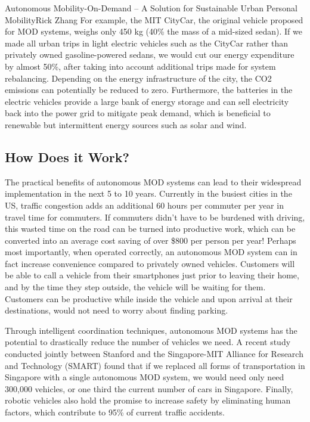 \documentclass{papertex}
\begin{document}
\begin{news}{2}{Autonomous Mobility-On-Demand – A Solution for Sustainable Urban Personal Mobility}{Rick Zhang}{}{}
For example, the MIT CityCar, the original vehicle proposed for MOD systems, 
weighs only 450 kg (40\% the mass of a mid-sized sedan). If we made all urban 
trips in light electric vehicles such as the CityCar rather than privately 
owned gasoline-powered sedans, we would cut our energy expenditure by almost 
50\%, after taking into account additional trips made for system rebalancing. 
Depending on the energy infrastructure of the city, the CO2 emissions can 
potentially be reduced to zero. Furthermore, the batteries in the electric 
vehicles provide a large bank of energy storage and can sell electricity back 
into the power grid to mitigate peak demand, which is beneficial to renewable 
but intermittent energy sources such as solar and wind.

\subsection*{\textbf{How Does it Work?}}

The practical benefits of autonomous MOD systems can lead to their widespread 
implementation in the next 5 to 10 years. Currently in the busiest cities in 
the US, traffic congestion adds an additional 60 hours per commuter per year 
in travel time for commuters. If commuters didn’t have to be burdened with 
driving, this wasted time on the road can be turned into productive work, 
which can be converted into an average cost saving of over \$800 per person 
per year! Perhaps most importantly, when operated correctly, an autonomous 
MOD system can in fact increase convenience compared to privately owned 
vehicles. Customers will be able to call a vehicle from their smartphones 
just prior to leaving their home, and by the time they step outside, the 
vehicle will be waiting for them. Customers can be productive while inside 
the vehicle and upon arrival at their destinations, would not need to worry 
about finding parking.

Through intelligent coordination techniques, autonomous MOD systems has the 
potential to drastically reduce the number of vehicles we need. A recent study 
conducted jointly between Stanford and the Singapore-MIT Alliance for Research 
and Technology (SMART) found that if we replaced all forms of transportation 
in Singapore with a single autonomous MOD system, we would need only need 
300,000 vehicles, or one third the current number of cars in Singapore. 
Finally, robotic vehicles also hold the promise to increase safety by 
eliminating human factors, which contribute to 95\% of current traffic 
accidents.


\end{news}
\end{document}
